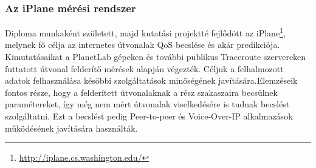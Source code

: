 \subsubsection*{Az iPlane mérési rendszer}
 


Diploma munkaként született, majd kutatási projektté fejlődött az iPlane\footnote{\url{http://iplane.cs.washington.edu/}}, melynek fő célja az internetes útvonalak QoS becslése és akár predikciója. Kimutatásaikat a PlanetLab gépeken és további publikus Traceroute szervereken futtatott útvonal felderítő mérések alapján végezték. Céljuk a felhalmozott adatok felhasználása későbbi szolgáltatások minőségének javítására.Elemzéseik fontos része, hogy a felderített útvonalaknak a rész szakaszaira becsülnek paramétereket, így még nem mért útvonalak viselkedésére is tudnak becslést szolgáltatni. Ezt a becslést pedig Peer-to-peer és Voice-Over-IP alkalmazások működésének javítására használták.


